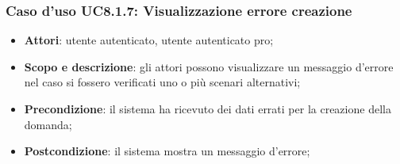 	\subsubsection{Caso d'uso UC8.1.7: Visualizzazione errore creazione}
	\begin{itemize}
		\item
			\textbf{Attori}: utente autenticato, utente autenticato pro;
		\item
			\textbf{Scopo e descrizione}: gli attori possono visualizzare un messaggio d'errore nel caso si fossero verificati uno o più scenari alternativi;
		\item		
			\textbf{Precondizione}: il sistema ha ricevuto dei dati errati per la creazione della domanda;
		\item
			\textbf{Postcondizione}: il sistema mostra un messaggio d'errore;
	\end{itemize}	
